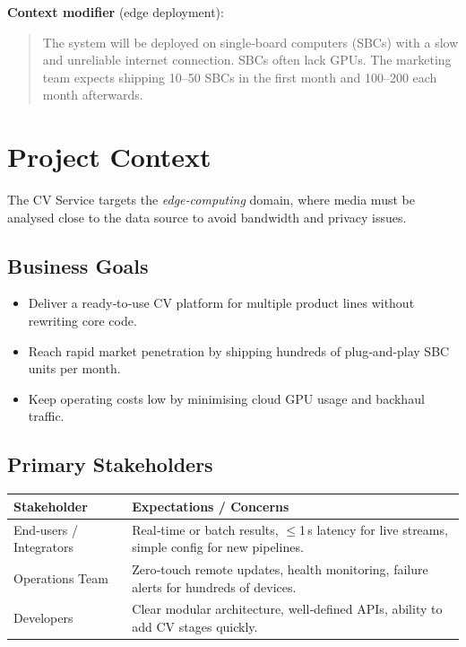 \documentclass[11pt,a4paper]{article}
\begin{document}
\textbf{Context modifier} (edge deployment):

\begin{quote}
The system will be deployed on single‑board computers (SBCs) with a slow and unreliable internet connection. SBCs often lack GPUs. The marketing team expects shipping 10–50 SBCs in the first month and 100–200 each month afterwards.
\end{quote}

\section{Project Context}
The CV Service targets the \emph{edge‑computing} domain, where media must be analysed close to the data source to avoid bandwidth and privacy issues.

\subsection*{Business Goals}
\begin{itemize}
  \item Deliver a ready‑to‑use CV platform for multiple product lines without rewriting core code.
  \item Reach rapid market penetration by shipping hundreds of plug‑and‑play SBC units per month.
  \item Keep operating costs low by minimising cloud GPU usage and backhaul traffic.
\end{itemize}

\subsection*{Primary Stakeholders}
\begin{tabular}{|p{3cm}|p{10cm}|}
\hline
\textbf{Stakeholder} & \textbf{Expectations / Concerns} \\ \hline
End‑users / Integrators & Real‑time or batch results, \(\le\)1 s latency for live streams, simple config for new pipelines. \\ \hline
Operations Team & Zero‑touch remote updates, health monitoring, failure alerts for hundreds of devices. \\ \hline
Developers & Clear modular architecture, well‑defined APIs, ability to add CV stages quickly. \\ \hline
\end{tabular}
\end{document}
